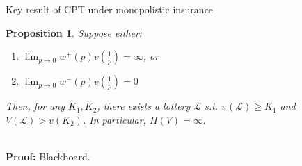 \documentclass[11pt, aspectratio=169]{beamer}
\newtheorem{proposition}{Proposition}
\begin{document}
       \begin{frame}{Key result of CPT under monopolistic insurance}
           \begin{proposition}
           Suppose either:\medskip
           \begin{enumerate}[(1)]
               \item $\lim_{p \to 0} w^{+}(p)v\left(\frac{1}{p}\right)=\infty$, or\medskip
               \item $\lim_{p \to 0} w^{-}(p)v\left(\frac{1}{p}\right)=0$\medskip
           \end{enumerate}
           Then, for any $K_1,K_2$, there exists a lottery $\mathcal{L}$
           s.t. $\pi(\mathcal{L}) \geq K_1$ and $V(\mathcal{L}) >v(K_2)$.
           In particular, $\Pi(V)=\infty.$
           \end{proposition}
           \hspace*{\fill} \\
       \textbf{Proof:} Blackboard.
       \end{frame}



\end{document}
